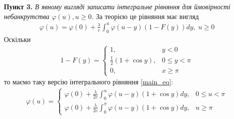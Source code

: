 \documentclass{extreport}
\newcommand{\task}[1]{\vspace{0.5em}\noindent\textbf{#1.}}
\begin{document}
\task{Пункт 3} \emph{В явному вигляді записати інтегральне рівняння для ймовірності небанкрутства $\varphi(u), u \geq 0$.} 
За теорією це рівняння має вигляд
\begin{gather}\label{main_eq}
    \varphi(u) = \varphi(0) + \frac{\lambda}{c} \int_0^u \varphi(u - y) \left(1 - F(y)\right) dy, \; u \geq 0
\end{gather}
Оскільки 
\begin{gather}\label{cdf_tail}
    1-F(y) = \begin{cases}
        1, & y < 0 \\
        \frac{1}{2} \left(1 + \cos y\right), & 0 \leq y < \pi \\
        0, & x \geq \pi
    \end{cases}
\end{gather}
то маємо таку версію інтегрального рівняння \eqref{main_eq}:
\begin{gather}
    \varphi(u) = \begin{cases}
        \varphi(0) + \frac{\lambda}{2c} \int_0^u \varphi(u - y) \left(1 + \cos y\right) dy, & 0 \leq u < \pi \\
        \varphi(0) + \frac{\lambda}{2c} \int_0^\pi \varphi(u - y) \left(1 + \cos y\right) dy, & u \geq \pi
    \end{cases}
\end{gather}
\end{document}

